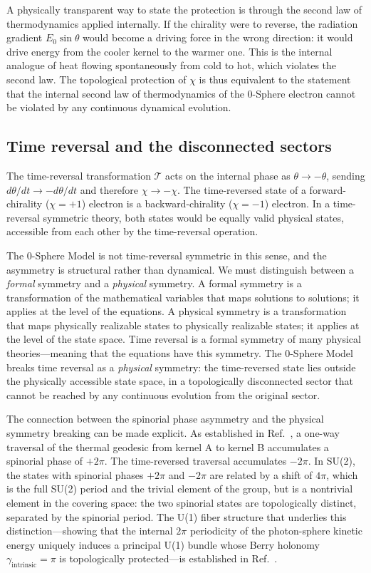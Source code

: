 \documentclass[%
 reprint, amsmath,amssymb, aps, prb, ]{revtex4-2}
\numberwithin{equation}{section}
\begin{document}
A physically transparent way to state the protection is through the second law of thermodynamics applied internally. If the chirality were to reverse, the radiation gradient $E_0 \sin\theta$ would become a driving force in the wrong direction: it would drive energy from the cooler kernel to the warmer one. This is the internal analogue of heat flowing spontaneously from cold to hot, which violates the second law. The topological protection of $\chi$ is thus equivalent to the statement that the internal second law of thermodynamics of the 0-Sphere electron cannot be violated by any continuous dynamical evolution.

\subsection{Time reversal and the disconnected sectors}
\label{sec:time_reversal_sectors}

The time-reversal transformation $\mathcal{T}$ acts on the internal phase as $\theta \to -\theta$, sending $d\theta/dt \to -d\theta/dt$ and therefore $\chi \to -\chi$. The time-reversed state of a forward-chirality ($\chi = +1$) electron is a backward-chirality ($\chi = -1$) electron. In a time-reversal symmetric theory, both states would be equally valid physical states, accessible from each other by the time-reversal operation.

The 0-Sphere Model is not time-reversal symmetric in this sense, and the asymmetry is structural rather than dynamical. We must distinguish between a \emph{formal} symmetry and a \emph{physical} symmetry. A formal symmetry is a transformation of the mathematical variables that maps solutions to solutions; it applies at the level of the equations. A physical symmetry is a transformation that maps physically realizable states to physically realizable states; it applies at the level of the state space. Time reversal is a formal symmetry of many physical theories---meaning that the equations have this symmetry. The 0-Sphere Model breaks time reversal as a \emph{physical} symmetry: the time-reversed state lies outside the physically accessible state space, in a topologically disconnected sector that cannot be reached by any continuous evolution from the original sector.

The connection between the spinorial phase asymmetry and the physical symmetry breaking can be made explicit. As established in Ref.~\cite{hanamura29}, a one-way traversal of the thermal geodesic from kernel A to kernel B accumulates a spinorial phase of $+2\pi$. The time-reversed traversal accumulates $-2\pi$. In SU(2), the states with spinorial phases $+2\pi$ and $-2\pi$ are related by a shift of $4\pi$, which is the full SU(2) period and the trivial element of the group, but is a nontrivial element in the covering space: the two spinorial states are topologically distinct, separated by the spinorial period. The U(1) fiber structure that underlies this distinction---showing that the internal $2\pi$ periodicity of the photon-sphere kinetic energy uniquely induces a principal U(1) bundle whose Berry holonomy $\gamma_{\mathrm{intrinsic}} = \pi$ is topologically protected---is established in Ref.~\cite{hanamura48}.
\end{document}
